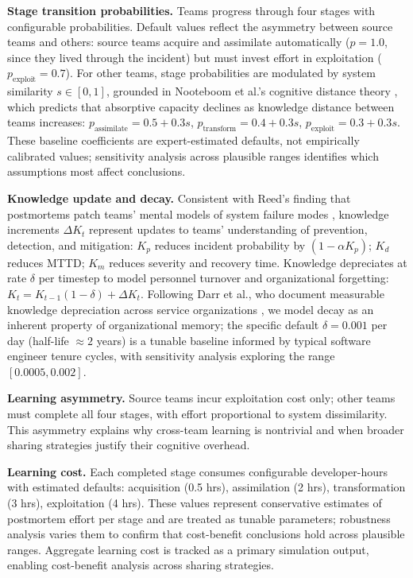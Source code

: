 \documentclass[conference,10pt]{IEEEtran}
\begin{document}
\textbf{Stage transition probabilities.} Teams progress through four stages with configurable probabilities. Default values reflect the asymmetry between source teams and others: source teams acquire and assimilate automatically ($p = 1.0$, since they lived through the incident) but must invest effort in exploitation ($p_\text{exploit} = 0.7$). For other teams, stage probabilities are modulated by system similarity $s \in [0,1]$, grounded in Nooteboom et al.'s cognitive distance theory \cite{nooteboom2007}, which predicts that absorptive capacity declines as knowledge distance between teams increases: $p_\text{assimilate} = 0.5 + 0.3s$, $p_\text{transform} = 0.4 + 0.3s$, $p_\text{exploit} = 0.3 + 0.3s$. These baseline coefficients are expert-estimated defaults, not empirically calibrated values; sensitivity analysis across plausible ranges identifies which assumptions most affect conclusions.

\textbf{Knowledge update and decay.} Consistent with Reed's finding that postmortems patch teams' mental models of system failure modes \cite{reed2019}, knowledge increments $\Delta K_t$ represent updates to teams' understanding of prevention, detection, and mitigation: $K_p$ reduces incident probability by $(1 - \alpha K_p)$; $K_d$ reduces MTTD; $K_m$ reduces severity and recovery time. Knowledge depreciates at rate $\delta$ per timestep to model personnel turnover and organizational forgetting: $K_t = K_{t-1}(1 - \delta) + \Delta K_t$. Following Darr et al., who document measurable knowledge depreciation across service organizations \cite{darr1995}, we model decay as an inherent property of organizational memory; the specific default $\delta = 0.001$ per day (half-life $\approx 2$ years) is a tunable baseline informed by typical software engineer tenure cycles, with sensitivity analysis exploring the range $[0.0005, 0.002]$.

\textbf{Learning asymmetry.} Source teams incur exploitation cost only; other teams must complete all four stages, with effort proportional to system dissimilarity. This asymmetry explains why cross-team learning is nontrivial and when broader sharing strategies justify their cognitive overhead.

\textbf{Learning cost.} Each completed stage consumes configurable developer-hours with estimated defaults: acquisition (0.5 hrs), assimilation (2 hrs), transformation (3 hrs), exploitation (4 hrs). These values represent conservative estimates of postmortem effort per stage and are treated as tunable parameters; robustness analysis varies them to confirm that cost-benefit conclusions hold across plausible ranges. Aggregate learning cost is tracked as a primary simulation output, enabling cost-benefit analysis across sharing strategies.
\end{document}
